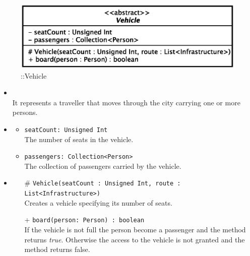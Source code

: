 \begin{figure}[h]
\centering
\includegraphics[scale=0.6,keepaspectratio]{images/solution/app/backend/vehicle.eps}
\caption{\pActive::Vehicle}
\label{fig:sd-app-vehicle}
\end{figure}
\FloatBarrier
\begin{itemize}
  \item \textbf{\descr} \\
    It represents a traveller that moves through the city carrying one or more
persons.
  \item \textbf{\attrs}
  \begin{itemize}
    \item \texttt{seatCount: Unsigned Int} \\
The number of seats in the vehicle.
    \item \texttt{passengers: Collection<Person>} \\
The collection of passengers carried by the vehicle.
  \end{itemize}
  \item \textbf{\ops}
  \begin{itemize} 
    \item[\#] \texttt{Vehicle(seatCount : Unsigned Int, route : List<Infrastructure>)} \\
Creates a vehicle specifying its number of seats.
    \item[+] \texttt{board(person: Person) : boolean} \\
If the vehicle is not full the person become a passenger and the method 
returns \textit{true}. Otherwise the access to the vehicle is not granted and 
the method returns false.
  \end{itemize}
\end{itemize}
